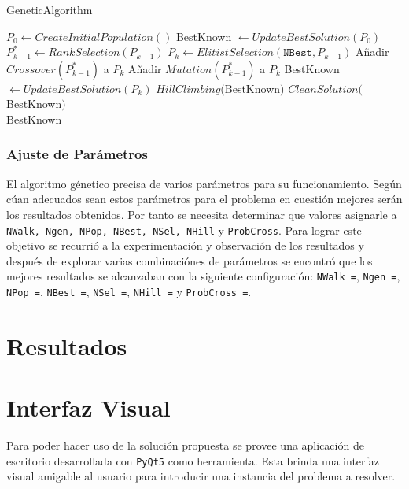 \documentclass[a4paper,10pt,twocolumn]{article}
\begin{document}
\algrenewcommand{}
\algrenewcommand{}
\begin{algorithm}
	\caption{GeneticAlgorithm}\label{genetic}
	\begin{algorithmic}[1]
		\State $P_0 \gets CreateInitialPopulation()$
		\State BestKnown $\gets UpdateBestSolution(P_0)$
		\State$P_{k-1}^* \gets RankSelection(P_{k-1})$
		\State$P_{k} \gets ElitistSelection(\mathtt{NBest},P_{k-1})$
					\State Añadir $Crossover(P_{k-1}^*)$ a $P_k$
				\Else
					\State Añadir $Mutation(P_{k-1}^*)$ a $P_k$
				\EndIf	
			\EndFor
		\State BestKnown $\gets UpdateBestSolution(P_k)$
		\EndFor
		\State $ HillClimbing($BestKnown$)$
		\State $ CleanSolution($BestKnown$)$\\
		\Return BestKnown
	\end{algorithmic}
\end{algorithm}


\subsubsection{Ajuste de Parámetros}
El algoritmo génetico precisa de varios parámetros para su funcionamiento. Según cúan adecuados sean estos parámetros para el problema en cuestión mejores serán los resultados obtenidos. Por tanto se necesita determinar que valores asignarle a \texttt{NWalk, Ngen, NPop, NBest, NSel, NHill} y \texttt{ProbCross}.
Para lograr este objetivo se recurrió a la experimentación y observación de los resultados y después de explorar varias combinaciónes de parámetros se encontró que los mejores resultados se alcanzaban con la siguiente configuración: \texttt{NWalk =}, \texttt{Ngen =}, \texttt{NPop =}, \texttt{NBest =}, \texttt{NSel =}, \texttt{NHill =} y \texttt{ProbCross =}.
\section{Resultados}

\section{Interfaz Visual}
Para poder hacer uso de la solución propuesta se provee una aplicación de escritorio desarrollada con \texttt{PyQt5} como herramienta. Esta brinda una interfaz visual amigable al usuario para introducir una instancia del problema a resolver.
\end{document}

